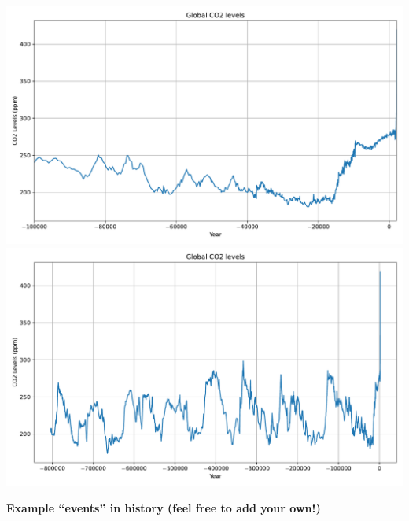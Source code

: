 \documentclass[12pt]{article}
\begin{document}
\newpage
\begin{center}
\includegraphics[width=\textwidth]{images/global-CO2_paleo_-100000-2100}\\[24pt]
\includegraphics[width=\textwidth]{images/global-CO2_paleo_800kyrBCE-2024.pdf}\\
\end{center}

\newpage
\clearpage
%
\thispagestyle{empty}

\begin{center}
{\Large \bf Example ``events'' in history (feel free to add your own!)}
\end{center}
\end{document}

